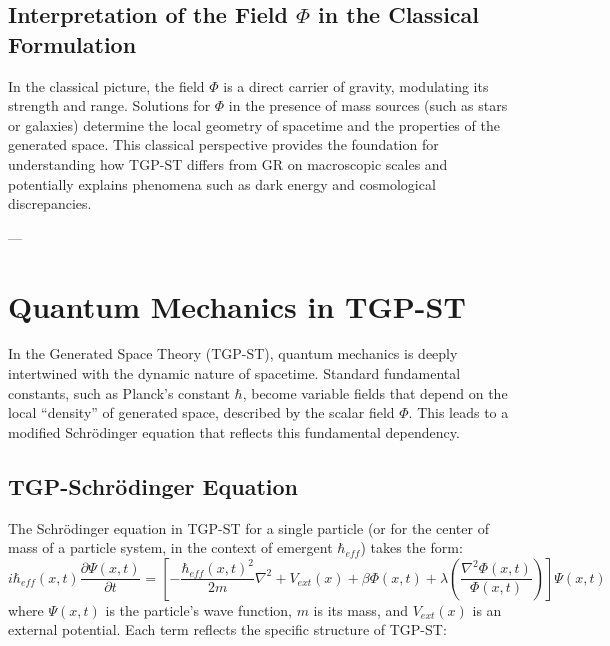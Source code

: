 \documentclass[11pt,a4paper]{article}
\begin{document}
\subsection{Interpretation of the Field $\Phi$ in the Classical Formulation}
In the classical picture, the field $\Phi$ is a direct carrier of gravity, modulating its strength and range. Solutions for $\Phi$ in the presence of mass sources (such as stars or galaxies) determine the local geometry of spacetime and the properties of the generated space. This classical perspective provides the foundation for understanding how TGP-ST differs from GR on macroscopic scales and potentially explains phenomena such as dark energy and cosmological discrepancies.

---

\section{Quantum Mechanics in TGP-ST}
\label{sec:MechanikaKwantowa}

In the Generated Space Theory (TGP-ST), quantum mechanics is deeply intertwined with the dynamic nature of spacetime. Standard fundamental constants, such as Planck's constant $\hbar$, become variable fields that depend on the local “density” of generated space, described by the scalar field $\Phi$. This leads to a modified Schrödinger equation that reflects this fundamental dependency.

\subsection{TGP-Schrödinger Equation}
The Schrödinger equation in TGP-ST for a single particle (or for the center of mass of a particle system, in the context of emergent $\hbar_{eff}$) takes the form:
\begin{equation}
    i\hbar_{eff}(x,t)\frac{\partial\Psi(x,t)}{\partial t} = \left[-\frac{\hbar_{eff}(x,t)^2}{2m}\nabla^2 + V_{ext}(x) + \beta\Phi(x,t) + \lambda\left(\frac{\nabla^2\Phi(x,t)}{\Phi(x,t)}\right)\right]\Psi(x,t)
    \label{eq:SchrodingerTGP}
\end{equation}
where $\Psi(x,t)$ is the particle’s wave function, $m$ is its mass, and $V_{ext}(x)$ is an external potential. Each term reflects the specific structure of TGP-ST:
\end{document}
